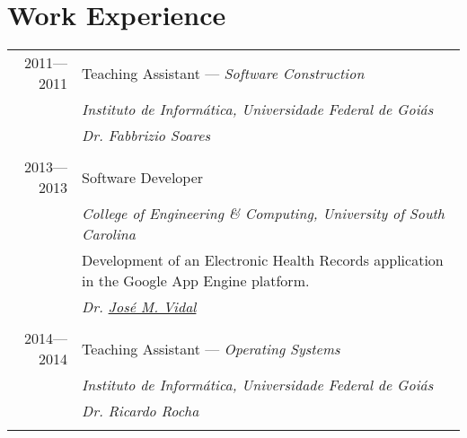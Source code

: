 \documentclass[a4paper,10pt]{article}
\begin{document}
\section{Work Experience}
\begin{tabular}{r|p{11cm}}

  \textsc{2011---2011}
  & Teaching Assistant --- \emph{Software Construction}\\
  &\emph{Instituto de Informática, Universidade Federal de Goiás}\\
  &\emph{Dr. Fabbrizio Soares}
  \\\multicolumn{2}{c}{} \\

  \textsc{2013---2013}
  & Software Developer\\
  &\emph{College of Engineering \& Computing, University of South Carolina}\\
  &\footnotesize{Development of an Electronic Health Records application in the Google App Engine platform.}\\
  &\emph{Dr. \href{http://jmvidal.cse.sc.edu}{José M. Vidal}}
  \\\multicolumn{2}{c}{} \\

  \textsc{2014---2014}
  & Teaching Assistant --- \emph{Operating Systems}\\
  &\emph{Instituto de Informática, Universidade Federal de Goiás}\\
  &\emph{Dr. Ricardo Rocha}
  \\\multicolumn{2}{c}{} \\

\end{tabular}

\end{document}

